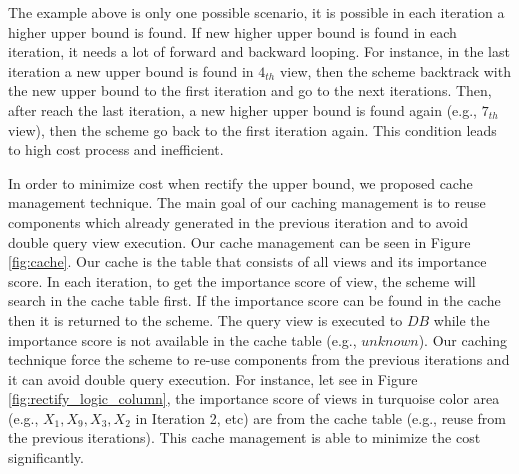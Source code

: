 \documentclass{article}
\begin{document}
The example above is only one possible scenario, it is possible in each iteration a higher upper bound is found. If new higher upper bound is found in each iteration, it needs a lot of forward and backward looping. For instance, in the last iteration a new upper bound is found in $4_{th}$ view, then the scheme backtrack with the new upper bound to the first iteration and go to the next iterations. Then, after reach the last iteration, a new higher upper bound is found again (e.g., $7_{th}$ view), then the scheme go back to the first iteration again. This condition leads to high cost process and inefficient. 

In order to minimize cost when rectify the upper bound, we proposed cache management technique. The main goal of our caching management is to reuse components which already generated in the previous iteration and to avoid double query view execution. Our cache management can be seen in Figure \ref{fig:cache}. Our cache is the table that consists of all views and its importance score. In each iteration, to get the importance score of view, the scheme will search in the cache table first. If the importance score can be found in the cache then it is returned to the scheme. The query view is executed to $DB$ while the importance score is not available in the cache table (e.g., $unknown$). Our caching technique force the scheme to re-use components from the previous iterations and it can avoid double query execution. For instance, let see in Figure \ref{fig:rectify_logic_column}, the importance score of views in turquoise color area (e.g., $X_1, X_9, X_3, X_2$ in Iteration 2, etc) are from the cache table (e.g., reuse from the previous iterations). This cache management is able to minimize the cost significantly.





  

  
\end{document}
